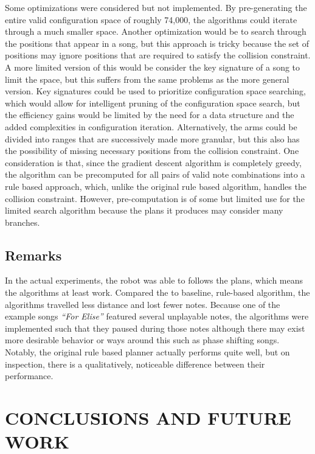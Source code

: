 \documentclass[letterpaper, 10 pt, conference]{ieeeconf}  %
\begin{document}
Some optimizations were considered but not implemented. By pre-generating the entire valid configuration space of roughly 74,000, the algorithms could iterate through a much smaller space. Another optimization would be to search through the positions that appear in a song, but this approach is tricky because the set of positions may ignore positions that are required to satisfy the collision constraint. A more limited version of this would be consider the key signature of a song to limit the space, but this suffers from the same problems as the more general version. Key signatures could be used to prioritize configuration space searching, which would allow for intelligent pruning of the configuration space search, but the efficiency gains would be limited by the need for a data structure and the added complexities in configuration iteration. Alternatively, the arms could be divided into ranges that are successively made more granular, but this also has the possibility of missing necessary positions from the collision constraint. One consideration is that, since the gradient descent algorithm is completely greedy, the algorithm can be precomputed for all pairs of valid note combinations into a rule based approach, which, unlike the original rule based algorithm, handles the collision constraint. However, pre-computation is of some but limited use for the limited search algorithm because the plans it produces may consider many branches.

\subsection{Remarks}

In the actual experiments, the robot was able to follows the plans, which means the algorithms at least work. Compared the to baseline, rule-based algorithm, the algorithms travelled less distance and lost fewer notes. Because one of the example songs \textit{``For Elise''} featured several unplayable notes, the algorithms were implemented such that they paused during those notes although there may exist more desirable behavior or ways around this such as phase shifting songs. Notably, the original rule based planner actually performs quite well, but on inspection, there is a qualitatively, noticeable difference between their performance.

\section{CONCLUSIONS AND FUTURE WORK}
\end{document}
